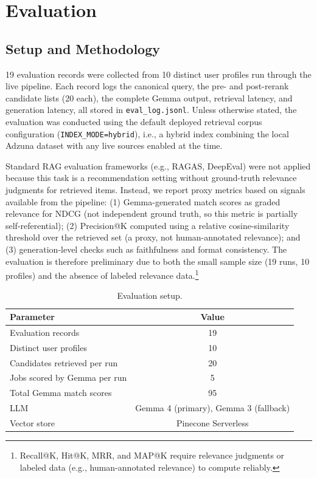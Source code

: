 \documentclass[11pt]{article}
\begin{document}
\section{Evaluation}

\subsection{Setup and Methodology}

19 evaluation records were collected from 10 distinct user profiles run through the live pipeline. Each record logs the canonical query, the pre- and post-rerank candidate lists (20 each), the complete Gemma output, retrieval latency, and generation latency, all stored in \texttt{eval\_log.jsonl}. Unless otherwise stated, the evaluation was conducted using the default deployed retrieval corpus configuration (\texttt{INDEX\_MODE=hybrid}), i.e., a hybrid index combining the local Adzuna dataset with any live sources enabled at the time.

Standard RAG evaluation frameworks (e.g., RAGAS, DeepEval) were not applied because this task is a recommendation setting without ground-truth relevance judgments for retrieved items. Instead, we report proxy metrics based on signals available from the pipeline: (1) Gemma-generated match scores as graded relevance for NDCG (not independent ground truth, so this metric is partially self-referential); (2) Precision@K computed using a relative cosine-similarity threshold over the retrieved set (a proxy, not human-annotated relevance); and (3) generation-level checks such as faithfulness and format consistency. The evaluation is therefore preliminary due to both the small sample size (19 runs, 10 profiles) and the absence of labeled relevance data.\footnote{Recall@K, Hit@K, MRR, and MAP@K require relevance judgments or labeled data (e.g., human-annotated relevance) to compute reliably.}

\begin{table}[H]
\centering\small
\begin{tabular}{lc}
\toprule
\textbf{Parameter} & \textbf{Value} \\
\midrule
Evaluation records            & 19 \\
Distinct user profiles        & 10 \\
Candidates retrieved per run  & 20 \\
Jobs scored by Gemma per run  & 5 \\
Total Gemma match scores      & 95 \\
LLM                           & Gemma 4 (primary), Gemma 3 (fallback) \\
Vector store                  & Pinecone Serverless \\
\bottomrule
\end{tabular}
\caption{Evaluation setup.}
\end{table}
\end{document}
